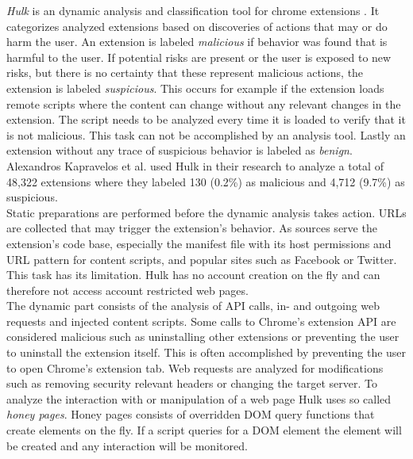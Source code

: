 	\textit{Hulk} is an dynamic analysis and classification tool for chrome extensions \cite{184485}. It categorizes analyzed extensions based on discoveries of actions that may or do harm the user. An extension is labeled \textit{malicious} if behavior was found that is harmful to the user. If potential risks are present or the user is exposed to new risks, but there is no certainty that these represent malicious actions, the extension is labeled \textit{suspicious}. This occurs for example if the extension loads remote scripts where the content can change without any relevant changes in the extension. The script needs to be analyzed every time it is loaded to verify that it is not malicious. This task can not be accomplished by an analysis tool. Lastly an extension without any trace of suspicious behavior is labeled as \textit{benign}. Alexandros Kapravelos et al. used Hulk in their research to analyze a total of 48,322 extensions where they labeled 130 (0.2\%) as malicious and 4,712 (9.7\%) as suspicious. \\
	Static preparations are performed before the dynamic analysis takes action. URLs are collected that may trigger the extension's behavior. As sources serve the extension's code base, especially the manifest file with its host permissions and URL pattern for content scripts, and popular sites such as Facebook or Twitter. This task has its limitation. Hulk has no account creation on the fly and can therefore not access account restricted web pages. \\
	The dynamic part consists of the analysis of API calls, in- and outgoing web requests and injected content scripts. Some calls to Chrome's extension API are considered malicious such as uninstalling other extensions or preventing the user to uninstall the extension itself. This is often accomplished by preventing the user to open Chrome's extension tab. Web requests are analyzed for modifications such as removing security relevant headers or changing the target server. To analyze the interaction with or manipulation of a web page Hulk uses so called \textit{honey pages}. Honey pages consists of overridden DOM query functions that create elements on the fly. If a script queries for a DOM element the element will be created and any interaction will be monitored. \\
	
